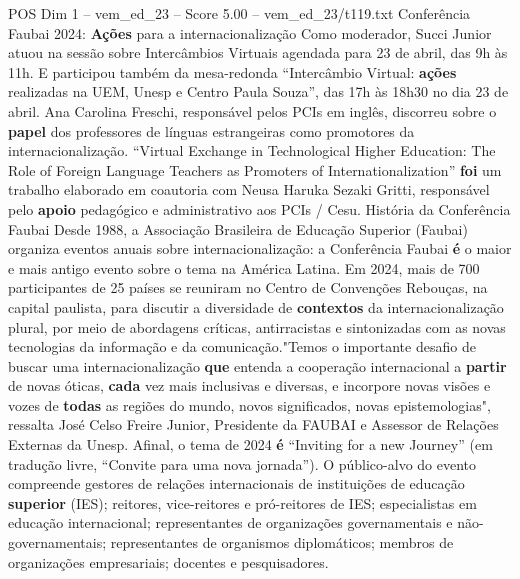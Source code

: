 \begin{textsample}{POS Dim 1 – vem\_ed\_23 – Score 5.00 – vem\_ed\_23/t119.txt}  \label{ex:f1_pos_145}
Conferência Faubai 2024: \textbf{Ações} para a internacionalização Como moderador, Succi Junior atuou na sessão sobre Intercâmbios Virtuais agendada para 23 de abril, das 9h às 11h.
E participou também da mesa-redonda “Intercâmbio Virtual: \textbf{ações} realizadas na UEM, Unesp e Centro Paula Souza”, das 17h às 18h30 no dia 23 de abril.
Ana Carolina Freschi, responsável pelos PCIs em inglês, discorreu sobre o \textbf{papel} dos professores de línguas estrangeiras como promotores da internacionalização. “Virtual Exchange in Technological Higher Education: The Role of Foreign Language Teachers as Promoters of Internationalization” \textbf{foi} um trabalho elaborado em coautoria com Neusa Haruka Sezaki Gritti, responsável pelo \textbf{apoio} pedagógico e administrativo aos PCIs / Cesu.
História da Conferência Faubai Desde 1988, a Associação Brasileira de Educação Superior (Faubai) organiza eventos anuais sobre internacionalização: a Conferência Faubai \textbf{é} o maior e mais antigo evento sobre o tema na América Latina.
Em 2024, mais de 700 participantes de 25 países se reuniram no Centro de Convenções Rebouças, na capital paulista, para discutir a diversidade de \textbf{contextos} da internacionalização plural, por meio de abordagens críticas, antirracistas e sintonizadas com as novas tecnologias da informação e da comunicação."Temos o importante desafio de buscar uma internacionalização \textbf{que} entenda a cooperação internacional a \textbf{partir} de novas óticas, \textbf{cada} vez mais inclusivas e diversas, e incorpore novas visões e vozes de \textbf{todas} as regiões do mundo, novos significados, novas epistemologias", ressalta José Celso Freire Junior, Presidente da FAUBAI e Assessor de Relações Externas da Unesp.
Afinal, o tema de 2024 \textbf{é} “Inviting for a new Journey” (em tradução livre, “Convite para uma nova jornada”).
O público-alvo do evento compreende gestores de relações internacionais de instituições de educação \textbf{superior} (IES); reitores, vice-reitores e pró-reitores de IES; especialistas em educação internacional; representantes de organizações governamentais e não-governamentais; representantes de organismos diplomáticos; membros de organizações empresariais; docentes e pesquisadores.

\end{textsample}
